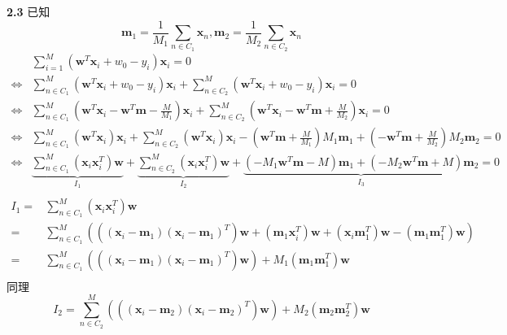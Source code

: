 \documentclass{article}
\begin{document}
\textbf{2.3}
已知
\begin{equation}
\bm{m}_1=\frac{1}{M_1}\sum_{n\in C_1} \bm{x}_n,\bm{m}_2=\frac{1}{M_2}\sum_{n\in C_2} \bm{x}_n
\end{equation}
\begin{align*}
&\sum_{i=1}^M (\bm{w}^T\bm{x}_i+w_0-y_i)\bm{x}_i=0\\
\iff & \sum_{n \in C_1}^M (\bm{w}^T\bm{x}_i+w_0-y_i)\bm{x}_i+\sum_{n \in C_2}^M (\bm{w}^T\bm{x}_i+w_0-y_i)\bm{x}_i=0\\
\iff & \sum_{n \in C_1}^M (\bm{w}^T\bm{x}_i-\bm{w}^T\bm{m}-\frac{M}{M_1})\bm{x}_i+\sum_{n \in C_2}^M (\bm{w}^T\bm{x}_i-\bm{w}^T\bm{m}+\frac{M}{M_2})\bm{x}_i=0\\
\iff & \sum_{n \in C_1}^M (\bm{w}^T\bm{x}_i)\bm{x}_i+\sum_{n \in C_2}^M (\bm{w}^T\bm{x}_i)\bm{x}_i-(\bm{w}^T\bm{m}+\frac{M}{M_1})M_1\bm{m}_1+(-\bm{w}^T\bm{m}+\frac{M}{M_2})M_2\bm{m}_2=0\\
\iff & \underbrace{\sum_{n \in C_1}^M (\bm{x}_i\bm{x}_i^T)\bm{w}}_{I_1}+\underbrace{\sum_{n \in C_2}^M (\bm{x}_i\bm{x}_i^T)\bm{w}}_{I_2}+\underbrace{(-M_1\bm{w}^T\bm{m}-M)\bm{m}_1+(-M_2\bm{w}^T\bm{m}+M)\bm{m}_2}_{I_3}=0\\
\end{align*}
\begin{align*}
I_1 =&  \sum_{n \in C_1}^M (\bm{x}_i\bm{x}_i^T)\bm{w} \\
=& \sum_{n \in C_1}^M \left( ((\bm{x}_i-\bm{m}_1)(\bm{x}_i-\bm{m}_1)^T)\bm{w}+(\bm{m}_1\bm{x}_i^T)\bm{w}+(\bm{x}_i\bm{m}_1^T)\bm{w}-(\bm{m}_1\bm{m}_1^T)\bm{w}\right)\\
=& \sum_{n \in C_1}^M \left( ((\bm{x}_i-\bm{m}_1)(\bm{x}_i-\bm{m}_1)^T)\bm{w}\right)+M_1(\bm{m}_1\bm{m}_1^T)\bm{w}\\
\end{align*}
同理
\begin{equation}
I_2=\sum_{n \in C_2}^M \left( ((\bm{x}_i-\bm{m}_2)(\bm{x}_i-\bm{m}_2)^T)\bm{w}\right)+M_2(\bm{m}_2\bm{m}_2^T)\bm{w}
\end{equation}
\end{document}
